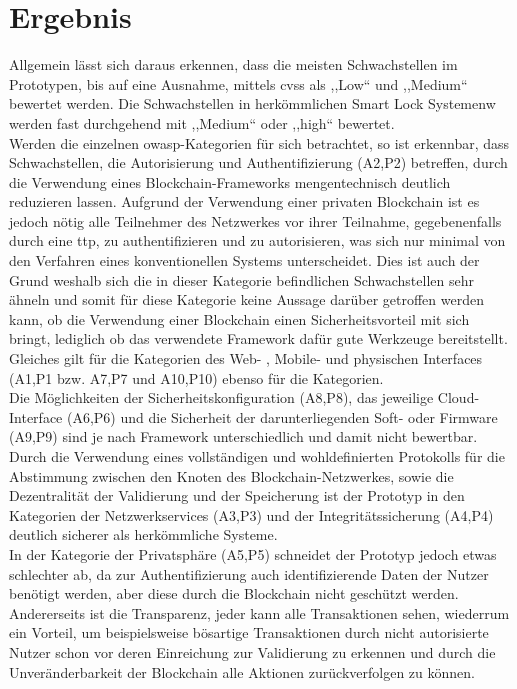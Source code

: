 \section{Ergebnis}
\label{sec:end}
    Allgemein lässt sich daraus erkennen, dass die meisten Schwachstellen im Prototypen, bis auf eine Ausnahme, mittels \gls{cvss} als ,,Low`` und ,,Medium`` bewertet werden. 
    Die Schwachstellen in herkömmlichen Smart Lock Systemenw werden fast durchgehend mit ,,Medium`` oder ,,high`` bewertet.
    \medskip\\
    Werden die einzelnen \gls{owasp}-Kategorien für sich betrachtet, so ist erkennbar, dass Schwachstellen, die Autorisierung und Authentifizierung (A2,P2) betreffen, durch die Verwendung eines Blockchain-Frameworks mengentechnisch deutlich reduzieren lassen. 
    Aufgrund der Verwendung einer privaten Blockchain ist es jedoch nötig alle Teilnehmer des Netzwerkes vor ihrer Teilnahme, gegebenenfalls durch eine \gls{ttp}, zu authentifizieren und zu autorisieren, was sich nur minimal von den Verfahren eines konventionellen Systems unterscheidet.
    Dies ist auch der Grund weshalb sich die in dieser Kategorie befindlichen Schwachstellen sehr ähneln und somit für diese Kategorie keine Aussage darüber getroffen werden kann, ob die Verwendung einer Blockchain einen Sicherheitsvorteil mit sich bringt, lediglich ob das verwendete Framework dafür gute Werkzeuge bereitstellt.\\
    Gleiches gilt für die Kategorien des Web- , Mobile- und physischen Interfaces (A1,P1 bzw. A7,P7 und A10,P10) ebenso für die Kategorien.\\
    Die Möglichkeiten der Sicherheitskonfiguration (A8,P8), das jeweilige Cloud-Interface (A6,P6) und die Sicherheit der darunterliegenden Soft- oder Firmware (A9,P9) sind je nach Framework unterschiedlich und damit nicht bewertbar.\\
    Durch die Verwendung eines vollständigen und wohldefinierten Protokolls für die Abstimmung zwischen den Knoten des Blockchain-Netzwerkes, sowie die Dezentralität der Validierung und der Speicherung ist der Prototyp in den Kategorien der Netzwerkservices (A3,P3) und der Integritätssicherung (A4,P4) deutlich sicherer als herkömmliche Systeme.\\
    In der Kategorie der Privatsphäre (A5,P5) schneidet der Prototyp jedoch etwas schlechter ab, 
    da zur Authentifizierung auch identifizierende Daten der Nutzer benötigt werden, aber diese durch die Blockchain nicht geschützt werden. 
    Andererseits ist die Transparenz, jeder kann alle Transaktionen sehen, wiederrum ein Vorteil, um beispielsweise bösartige Transaktionen durch nicht autorisierte Nutzer schon vor deren Einreichung zur Validierung zu erkennen und durch die Unveränderbarkeit der Blockchain alle Aktionen zurückverfolgen zu können.
